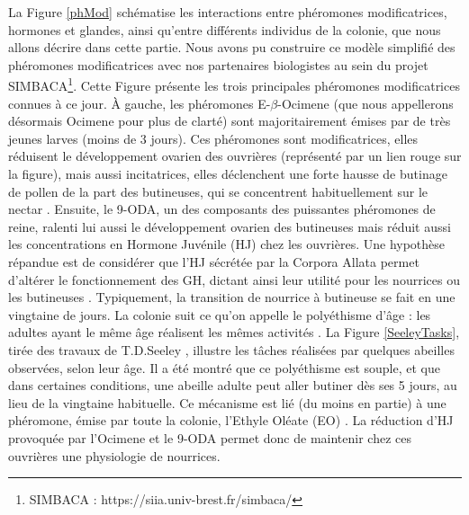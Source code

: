 			La Figure \ref{phMod} schématise les interactions entre phéromones modificatrices, hormones et glandes, ainsi qu'entre différents individus de la colonie, que nous allons décrire dans cette partie. Nous avons pu construire ce modèle simplifié des phéromones modificatrices avec nos partenaires biologistes au sein du projet SIMBACA\footnote{SIMBACA : https://siia.univ-brest.fr/simbaca/}. Cette Figure présente les trois principales phéromones modificatrices connues à ce jour. À gauche, les phéromones E-$\beta$-Ocimene (que nous appellerons désormais Ocimene pour plus de clarté) sont majoritairement émises par de très jeunes larves (moins de 3 jours). Ces phéromones sont modificatrices, elles réduisent le développement ovarien des ouvrières (représenté par un lien rouge sur la figure), mais aussi incitatrices, elles déclenchent une forte hausse de butinage de pollen de la part des butineuses, qui se concentrent habituellement sur le nectar \cite{maisonnasse_e-b-ocimene_2010}. Ensuite, le 9-ODA, un des composants des puissantes phéromones de reine, ralenti lui aussi le développement ovarien des butineuses mais réduit aussi les concentrations en Hormone Juvénile (HJ) chez les ouvrières. Une hypothèse répandue est de considérer que l'HJ sécrétée par la Corpora Allata permet d'altérer le fonctionnement des GH, dictant ainsi leur utilité pour les nourrices ou les butineuses \cite{robinson_colony_1998}. Typiquement, la transition de nourrice à butineuse se fait en une vingtaine de jours. La colonie suit ce qu'on appelle le polyéthisme d'âge : les adultes ayant le même âge réalisent les mêmes activités \cite{seeley_age_1991}.  La Figure \ref{SeeleyTasks}, tirée des travaux de T.D.Seeley \cite{seeley_wisdom_1995}, illustre les tâches réalisées par quelques abeilles observées, selon leur âge. Il a été montré que ce polyéthisme est souple, et que dans certaines conditions, une abeille adulte peut aller butiner dès ses 5 jours, au lieu de la vingtaine habituelle. Ce mécanisme est lié (du moins en partie) à une phéromone, émise par toute la colonie, l'Ethyle Oléate (EO) \cite{le_conte_primer_2001}. La réduction d'HJ provoquée par l'Ocimene et le 9-ODA permet donc de maintenir chez ces ouvrières une physiologie de nourrices.
			

